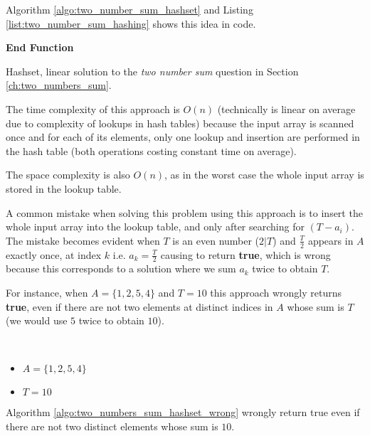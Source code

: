 Algorithm \ref{algo:two_number_sum_hashset} and Listing \ref{list:two_number_sum_hashing} shows this idea in code.

\begin{algorithm}
	   
	
    \textbf{End Function}

		\caption{Hashset, linear solution to the \textit{two number sum} question in Section
		\ref{ch:two_numbers_sum}.}
		\label{algo:two_number_sum_hashset}
\end{algorithm}




The time complexity of this approach is $O(n)$ (technically is linear on average due to complexity of lookups in hash tables) because the input array is scanned once and for each
of its elements, only one lookup and insertion are performed in the hash table (both operations costing constant time on average).

The space complexity
is also $O(n)$, as in the worst case the whole input array is stored in the lookup table.

A common mistake when solving this problem using this approach is to insert the whole input array into the lookup table, and only after searching for $(T-a_i)$.
The mistake becomes evident when $T$ is an even number ($2 | T$) and $\frac{T}{2}$ appears in $A$  exactly once, at index $k$ i.e. $a_k = \frac{T}{2}$ causing  to return \textbf{true}, which is wrong because this corresponds to a solution where we sum $a_k$ twice to obtain $T$.

For instance, when $A=\{1,2,5,4\}$ and $T=10$ this approach wrongly returns \textbf{true}, even if there are not two elements at distinct indices in $A$ whose sum is $T$ (we would use $5$ twice to obtain $10$).
\begin{example}
	\hfill \\ 
	\begin{itemize}
		\item[] $A=\{1,2,5,4\}$
	\item[] $T = 10$
\end{itemize}
	Algorithm \ref{algo:two_numbers_sum_hashset_wrong} wrongly return true even if there are not two
	distinct elements whose sum is $10$.
\end{example}


